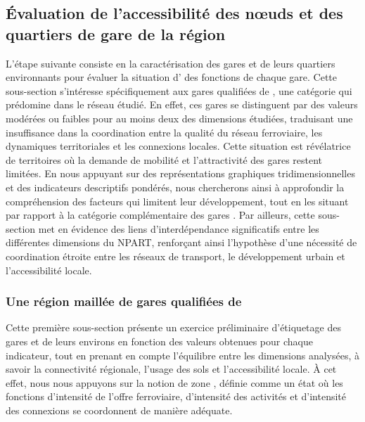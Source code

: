 \begin{refsegment}
\subsection{Évaluation de l'accessibilité des nœuds et des quartiers de gare de la région
    \label{chap6:results-caracterisation-gares}
    }

L'étape suivante consiste en la caractérisation des gares et de leurs quartiers environnants pour évaluer la situation d' des fonctions de chaque gare. Cette sous-section s’intéresse spécifiquement aux gares qualifiées de , une catégorie qui prédomine dans le réseau étudié. En effet, ces gares se distinguent par des valeurs modérées ou faibles pour au moins deux des dimensions étudiées, traduisant une insuffisance dans la coordination entre la qualité du réseau ferroviaire, les dynamiques territoriales et les connexions locales. Cette situation est révélatrice de territoires où la demande de mobilité et l’attractivité des gares restent limitées. En nous appuyant sur des représentations graphiques tridimensionnelles et des indicateurs descriptifs pondérés, nous chercherons ainsi à approfondir la compréhension des facteurs qui limitent leur développement, tout en les situant par rapport à la catégorie complémentaire des gares . Par ailleurs, cette sous-section met en évidence des liens d’interdépendance significatifs entre les différentes dimensions du \acrshort{NPART}, renforçant ainsi l’hypothèse d’une nécessité de coordination étroite entre les réseaux de transport, le développement urbain et l’accessibilité locale.%

\subsubsection*{Une région maillée de gares qualifiées de 
    \label{chap6:results-caracterisation-gares-dependance}
    }

Cette première sous-section présente un exercice préliminaire d’étiquetage des gares et de leurs environs en fonction des valeurs obtenues pour chaque indicateur, tout en prenant en compte l'équilibre entre les dimensions analysées, à savoir la connectivité régionale, l'usage des sols et l'accessibilité locale. À cet effet, nous nous appuyons sur la notion de zone , définie comme un état où les fonctions d'intensité de l'offre ferroviaire, d'intensité des activités et d'intensité des connexions se coordonnent de manière adéquate.%


\end{refsegment}
